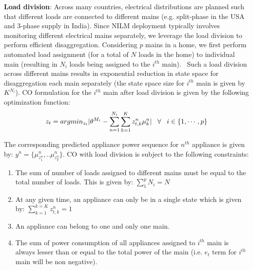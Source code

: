 \documentclass[conference]{IEEEtran}
\newcommand{\denselistbib}{
  \itemsep -.6pt\topsep-4pt\partopsep-4pt
}
\begin{document}
\noindent \textbf{Load division}: Across many countries, electrical distributions are planned such that different loads are connected to different mains (e.g. split-phase in the USA and 3-phase supply in India). Since NILM deployment typically involves monitoring different electrical mains separately, we leverage the load division to perform efficient disaggregation. Considering $p$ mains in a home, we first perform automated load assignment (for a total of $N$ loads in the home) to individual main (resulting in $N_i$ loads being assigned to the $i^{th}$ main).%
~Such a load division across different mains results in exponential reduction in state space for disaggregation each main separately (the state space size for $i^{th}$ main is given by $K^{N_i}$). %
CO formulation for the $i^{th}$ main after load division is given by the following optimization function: 
\vspace{-4mm}
$$z_t=arg min_{z_t}|\theta^{M_i}-\sum\limits_{n=1}^{N_i}\sum\limits_{k=1}^{K}z_{t,k}^n\mu_k^n| \;\;\; \forall \;\;\; i\in \{1,\cdots,p\}\vspace{-2mm}$$

\noindent The corresponding predicted appliance power sequence for $n^{th}$ appliance is given by: $y^n=\{\mu_{z_1^n}^n,..\mu_{z_T^n}^n \}$. CO with load division is subject to the following constraints:
\vspace{-2mm}
\begin{enumerate}\denselistbib
\item The sum of number of loads assigned to different mains must be equal to the total number of loads. This is given by: $\sum\limits_{1}^{p}{N_i}=N$
\item At any given time, an appliance can only be in a single state which is given by: $\sum\limits_{k=1}^{k=K} z_{t,k}^n=1$
\item An appliance can belong to one and only one main. 
\item The sum of power consumption of all appliances assigned to $i^{th}$ main is always lesser than or equal to the total power of the main (i.e. $e_t$ term for $i^{th}$ main will be non negative).
\end{enumerate}


\end{document}
